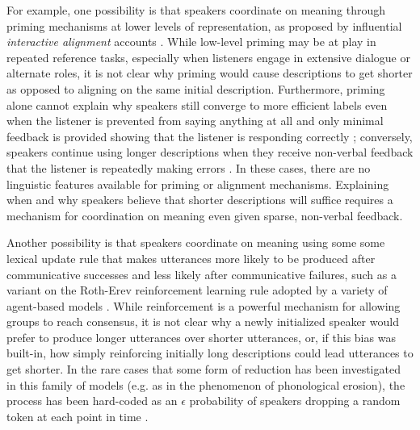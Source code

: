 For example, one possibility is that speakers coordinate on meaning through priming mechanisms at lower levels of representation, as proposed by influential  \emph{interactive alignment} accounts \cite{pickering2004toward, pickering2006alignment, garrod2009joint}.
While low-level priming may be at play in repeated reference tasks, especially when listeners engage in extensive dialogue or alternate roles, it is not clear why priming would cause descriptions to get shorter as opposed to aligning on the same initial description.
Furthermore, priming alone cannot explain why speakers still converge to more efficient labels even when the listener is prevented from saying anything at all and only minimal feedback is provided showing that the listener is responding correctly \cite{KraussWeinheimer66_Tangrams}; conversely, speakers continue using longer descriptions when they receive non-verbal feedback that the listener is repeatedly making errors \cite<see also>{hawkins2020characterizing}.
In these cases, there are no linguistic features available for priming or alignment mechanisms.
Explaining when and why speakers believe that shorter descriptions will suffice requires a mechanism for coordination on meaning even given sparse, non-verbal feedback.

Another possibility is that speakers coordinate on meaning using some some lexical update rule that makes utterances more likely to be produced after communicative successes and less likely after communicative failures, such as a variant on the Roth-Erev reinforcement learning rule \cite{erev1998predicting} adopted by a variety of agent-based models \cite{steels_self-organizing_1995,barr_establishing_2004,young_evolution_2015}.
While reinforcement is a powerful mechanism for allowing groups to reach consensus, it is not clear why a newly initialized speaker would prefer to produce longer utterances over shorter utterances, or, if this bias was built-in, how simply reinforcing initially long descriptions could lead utterances to get shorter. 
In the rare cases that some form of reduction has been investigated in this family of models (e.g. as in the phenomenon of phonological erosion), the process has been hard-coded as an $\epsilon$ probability of speakers dropping a random token at each point in time \cite{beuls2013agent,steels2016agent}.

